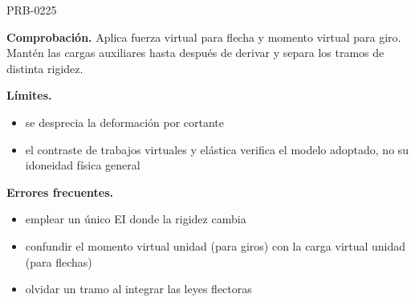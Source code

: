 \begin{studiumworked}{PRB-0225}
\par\textbf{Comprobación.} Aplica fuerza virtual para flecha y momento virtual para giro. Mantén las cargas auxiliares hasta después de derivar y separa los tramos de distinta rigidez.

\textbf{Límites.}\begin{itemize}\item se desprecia la deformación por cortante
\item el contraste de trabajos virtuales y elástica verifica el modelo adoptado, no su idoneidad física general\end{itemize}

\textbf{Errores frecuentes.}\begin{itemize}\item emplear un único EI donde la rigidez cambia
\item confundir el momento virtual unidad (para giros) con la carga virtual unidad (para flechas)
\item olvidar un tramo al integrar las leyes flectoras\end{itemize}

\end{studiumworked}

\Needspace{.3\textheight}

